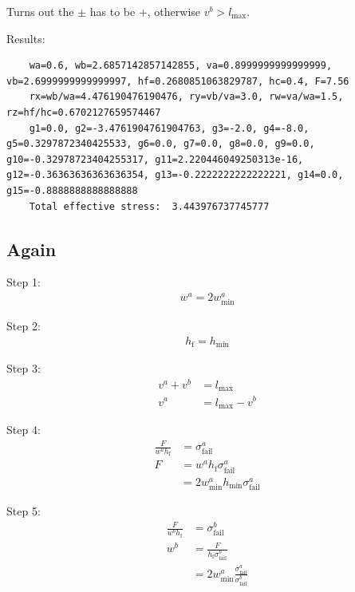 Turns out the $\pm$ has to be $+$, otherwise $v^b > l_\text{max}$.

Results:
\begin{verbatim}
	wa=0.6, wb=2.6857142857142855, va=0.8999999999999999, vb=2.6999999999999997, hf=0.2680851063829787, hc=0.4, F=7.56
	rx=wb/wa=4.476190476190476, ry=vb/va=3.0, rw=va/wa=1.5, rz=hf/hc=0.6702127659574467
	g1=0.0, g2=-3.4761904761904763, g3=-2.0, g4=-8.0, g5=0.3297872340425533, g6=0.0, g7=0.0, g8=0.0, g9=0.0, g10=-0.32978723404255317, g11=2.220446049250313e-16, g12=-0.36363636363636354, g13=-0.2222222222222221, g14=0.0, g15=-0.8888888888888888
	Total effective stress:  3.443976737745777
\end{verbatim}

\subsection{Again}


Step 1:
\begin{align*}
	w^a = 2 w^a_\text{min}
\end{align*}

Step 2:
\begin{align*}
	h_\text{f} = h_\text{min}
\end{align*}

Step 3:
\begin{align*}
	v^a + v^b &= l_\text{max} \\
	v^a &= l_\text{max} - v^b
\end{align*}

Step 4:
\begin{align*}
	\frac{ F }{ w^a h_\text{f} } &= \sigma^a_\text{fail} \\
	F &= w^a h_\text{f} \sigma^a_\text{fail} \\
	&= 2 w^a_\text{min} h_\text{min} \sigma^a_\text{fail} 
\end{align*}

Step 5:
\begin{align*}
	\frac{ F }{ w^b h_\text{f} } &= \sigma^b_\text{fail} \\
	w^b &= \frac{ F }{ h_\text{f} \sigma^b_\text{fail} } \\
	&= 2 w^a_\text{min}  \frac{ \sigma^a_\text{fail} }{ \sigma^b_\text{fail} } 
\end{align*}

